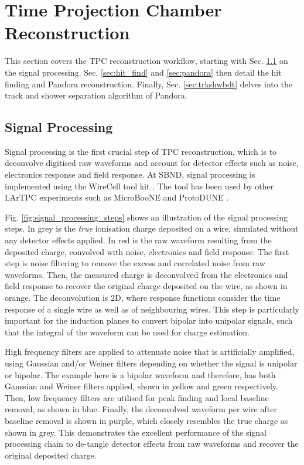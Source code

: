 \section{Time Projection Chamber Reconstruction}
\label{sec:reco_tpc}

This section covers the TPC reconstruction workflow, starting with Sec. \ref{sec:signal_process} on the signal processing.
Sec. \ref{sec:hit_find} and \ref{sec:pandora} then detail the hit finding and Pandora reconstruction.
Finally, Sec. \ref{sec:trkshwbdt} delves into the track and shower separation algorithm of Pandora. 

\subsection{Signal Processing}
\label{sec:signal_process}

Signal processing is the first crucial step of TPC reconstruction, which is to deconvolve digitised raw waveforms and account for detector effects such as noise, electronics response and field response. 
At SBND, signal processing is implemented using the WireCell tool kit \cite{wirecell}.
The tool has been used by other LArTPC experiments such as MicroBooNE \cite{wirecell} and ProtoDUNE \cite{wirecell_protodune}.

Fig. \ref{fig:signal_processing_steps} shows an illustration of the signal processing steps.  
In grey is the \textit{true} ionisation charge deposited on a wire, simulated without any detector effects applied.
In red is the raw waveform resulting from the deposited charge, convolved with noise, electronics and field response.
The first step is noise filtering to remove the excess and correlated noise from raw waveforms.
Then, the measured charge is deconvolved from the electronics and field response to recover the original charge deposited on the wire, as shown in orange.
The deconvolution is 2D, where response functions consider the time response of a single wire as well as of neighbouring wires.
This step is particularly important for the induction planes to convert bipolar into unipolar signals, such that the integral of the waveform can be used for charge estimation.

High frequency filters are applied to attenuate noise that is artificially amplified, using Gaussian and/or Weiner filters depending on whether the signal is unipolar or bipolar.
The example here is a bipolar waveform and therefore, has both Gaussian and Weiner filters applied, shown in yellow and green respectively.
Then, low frequency filters are utilised for peak finding and local baseline removal, as shown in blue.
Finally, the deconvolved waveform per wire after baseline removal is shown in purple, which closely resembles the true charge as shown in grey.
This demonstrates the excellent performance of the signal processing chain to de-tangle detector effects from raw waveforms and recover the original deposited charge.  

